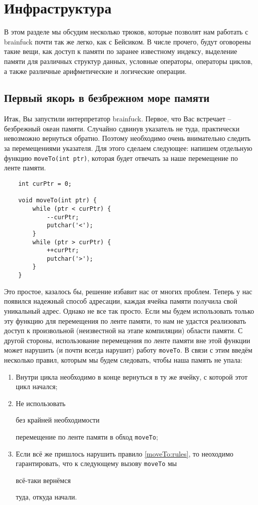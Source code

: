 \documentclass{book}
\begin{document}
\chapter{Инфраструктура}
В этом разделе мы обсудим несколько трюков, которые позволят нам работать с brainfuck
почти так же легко, как с Бейсиком. В числе прочего, будут оговорены такие вещи, как доступ к
памяти по заранее известному индексу, выделение памяти для различных структур данных, условные
операторы, операторы циклов, а также различные арифметические и логические операции.

\section{Первый якорь в безбрежном море памяти}

Итак, Вы запустили интерпретатор brainfuck. Первое, что Вас встречает -- безбрежный
океан памяти. Случайно сдвинув указатель не туда, практически невозможно вернуться
обратно. Поэтому необходимо очень внимательно следить за перемещениями указателя.
Для этого сделаем следующее: напишем отдельную функцию \texttt{moveTo(int ptr)},
которая будет отвечать за наше перемещение по ленте памяти. 

\begin{verbatim}
    int curPtr = 0;

    void moveTo(int ptr) {
        while (ptr < curPtr) {
            --curPtr;
            putchar('<');
        }
        while (ptr > curPtr) {
            ++curPtr;
            putchar('>');
        }
    }
\end{verbatim}

Это простое, казалось бы, решение избавит нас от многих проблем. Теперь у нас появился
надежный способ адресации, каждая ячейка памяти получила свой уникальный адрес. Однако не
все так просто. Если мы будем использовать только эту функцию для перемещения по ленте
памяти, то нам не удастся реализовать доступ к произвольной (неизвестной на этапе компиляции)
области памяти. С другой стороны, использование перемещения по ленте памяти вне этой функции
может нарушить (и почти всегда нарушит) работу \texttt{moveTo}. В связи с этим введём
несколько правил, которым мы будем следовать, чтобы наша память не упала:

\begin{enumerate}
    \item Внутри цикла необходимо в конце вернуться в ту же ячейку, с которой этот цикл начался;
    \item Не использовать \begin{em}без крайней необходимости\end{em} перемещение по ленте
            памяти в обход \texttt{moveTo}; \label{moveTo:rules}
    \item Если всё же пришлось нарушить правило \ref{moveTo:rules}, то неоходимо гарантировать,
            что к следующему вызову \texttt{moveTo} мы \begin{em}всё-таки вернёмся\end{em} туда,
            откуда начали.
\end{enumerate}
\end{document}
